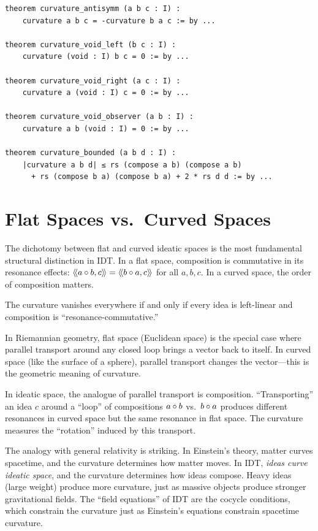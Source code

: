 \begin{lstlisting}[caption={Curvature properties (IDT\_v3\_Emergence.lean)}]
theorem curvature_antisymm (a b c : I) :
    curvature a b c = -curvature b a c := by ...

theorem curvature_void_left (b c : I) :
    curvature (void : I) b c = 0 := by ...

theorem curvature_void_right (a c : I) :
    curvature a (void : I) c = 0 := by ...

theorem curvature_void_observer (a b : I) :
    curvature a b (void : I) = 0 := by ...

theorem curvature_bounded (a b d : I) :
    |curvature a b d| ≤ rs (compose a b) (compose a b)
      + rs (compose b a) (compose b a) + 2 * rs d d := by ...
\end{lstlisting}


\section{Flat Spaces vs.\ Curved Spaces}

The dichotomy between flat and curved ideatic spaces is the most fundamental
structural distinction in IDT. In a flat space, composition is commutative
in its resonance effects: $\langle\!\langle a \circ b, c \rangle\!\rangle = \langle\!\langle b \circ a, c \rangle\!\rangle$ for
all $a, b, c$. In a curved space, the order of composition matters.

\begin{theorem}
\label{thm:flat-iff}
The curvature vanishes everywhere if and only if every idea is left-linear
and composition is ``resonance-commutative.''
\end{theorem}

\begin{interpretation}
In Riemannian geometry, flat space (Euclidean space) is the special case where
parallel transport around any closed loop brings a vector back to itself. In
curved space (like the surface of a sphere), parallel transport changes the
vector---this is the geometric meaning of curvature.

In ideatic space, the analogue of parallel transport is composition. ``Transporting''
an idea $c$ around a ``loop'' of compositions $a \circ b$ vs.\ $b \circ a$
produces different resonances in curved space but the same resonance in flat space.
The curvature measures the ``rotation'' induced by this transport.

The analogy with general relativity is striking. In Einstein's theory, matter
curves spacetime, and the curvature determines how matter moves. In IDT,
\emph{ideas curve ideatic space}, and the curvature determines how ideas compose.
Heavy ideas (large weight) produce more curvature, just as massive objects produce
stronger gravitational fields. The ``field equations'' of IDT are the cocycle
conditions, which constrain the curvature just as Einstein's equations constrain
spacetime curvature.
\end{interpretation}


